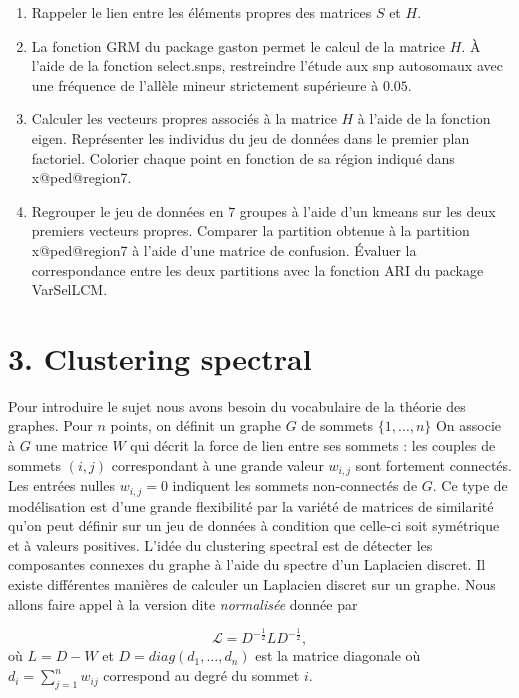 \documentclass[11pt,]{article}
\begin{document}
\begin{enumerate}
\def\labelenumi{\alph{enumi}.}
\setcounter{enumi}{2}
\item
  Rappeler le lien entre les éléments propres des matrices \(S\) et
  \(H\).
\item
  La fonction \textsf{GRM} du package \textsf{gaston} permet le calcul
  de la matrice \(H\). À l'aide de la fonction \textsf{select.snps},
  restreindre l'étude aux snp autosomaux avec une fréquence de l'allèle
  mineur strictement supérieure à \(0.05\).
\item
  Calculer les vecteurs propres associés à la matrice \(H\) à l'aide de
  la fonction \textsf{eigen}. Représenter les individus du jeu de
  données dans le premier plan factoriel. Colorier chaque point en
  fonction de sa région indiqué dans \textsf{x@ped@region7}.
\item
  Regrouper le jeu de données en \(7\) groupes à l'aide d'un
  \textsf{kmeans} sur les deux premiers vecteurs propres. Comparer la
  partition obtenue à la partition \textsf{x@ped@region7} à l'aide d'une
  matrice de confusion. Évaluer la correspondance entre les deux
  partitions avec la fonction \textsf{ARI} du package
  \textsf{VarSelLCM}.
\end{enumerate}

\section{3. Clustering spectral}\label{clustering-spectral}

Pour introduire le sujet nous avons besoin du vocabulaire de la théorie
des graphes. Pour \(n\) points, on définit un graphe \(G\) de sommets
\(\{1,\ldots,n\}\) On associe à \(G\) une matrice \(W\) qui décrit la
force de lien entre ses sommets : les couples de sommets \((i,j)\)
correspondant à une grande valeur \(w_{i,j}\) sont fortement connectés.
Les entrées nulles \(w_{i,j} = 0\) indiquent les sommets non-connectés
de \(G\). Ce type de modélisation est d'une grande flexibilité par la
variété de matrices de similarité qu'on peut définir sur un jeu de
données à condition que celle-ci soit symétrique et à valeurs positives.
L'idée du clustering spectral est de détecter les composantes connexes
du graphe à l'aide du spectre d'un Laplacien discret. Il existe
différentes manières de calculer un Laplacien discret sur un graphe.
Nous allons faire appel à la version dite \emph{normalisée} donnée par

\[\mathcal L =  D^{-\frac{1}{2}} L D^{-\frac{1}{2}},\] où \(L = D-W\) et
\(D= diag(d_1, \ldots, d_n)\) est la matrice diagonale où
\(d_i = \sum_{j=1}^n w_{ij}\) correspond au degré du sommet \(i\).
\end{document}
